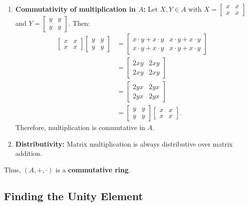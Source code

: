 \begin{enumerate}
    \item \textbf{Commutativity of multiplication in $A$:}
    Let $X, Y \in A$ with $X = \begin{bmatrix} x & x \\ x & x \end{bmatrix}$ and $Y = \begin{bmatrix} y & y \\ y & y \end{bmatrix}$. Then:
    \begin{align*}
    \begin{bmatrix} x & x \\ x & x \end{bmatrix} \begin{bmatrix} y & y \\ y & y \end{bmatrix} &= \begin{bmatrix} x \cdot y + x \cdot y & x \cdot y + x \cdot y \\ x \cdot y + x \cdot y & x \cdot y + x \cdot y \end{bmatrix} \\
    &= \begin{bmatrix} 2xy & 2xy \\ 2xy & 2xy \end{bmatrix} \\
    &= \begin{bmatrix} 2yx & 2yx \\ 2yx & 2yx \end{bmatrix} \\
    &= \begin{bmatrix} y & y \\ y & y \end{bmatrix} \begin{bmatrix} x & x \\ x & x \end{bmatrix}.
    \end{align*}
    Therefore, multiplication is commutative in $A$.
    
    \item \textbf{Distributivity:}
    Matrix multiplication is always distributive over matrix addition.
\end{enumerate}
Thus, $(A, +, \cdot)$ is a \textbf{commutative ring}.

\subsection{Finding the Unity Element}

